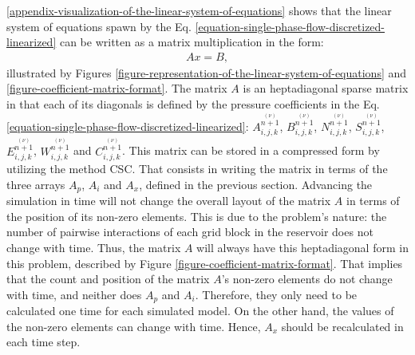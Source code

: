 \autoref{appendix-visualization-of-the-linear-system-of-equations} shows that the linear system of equations spawn by the Eq. \ref{equation-single-phase-flow-discretized-linearized} can be written as a matrix multiplication in the form:
%
\begin{align}
	A x = B,
\end{align}
%
illustrated by Figures \ref{figure-representation-of-the-linear-system-of-equations} and \ref{figure-coefficient-matrix-format}. 
%
The matrix $A$ is an heptadiagonal sparse matrix in that each of its diagonals is defined by the pressure coefficients in the Eq. \ref{equation-single-phase-flow-discretized-linearized}: $A^{\stackrel{(\nu)}{n+1}}_{i,j,k}$, $B^{\stackrel{(\nu)}{n+1}}_{i,j,k}$, $N^{\stackrel{(\nu)}{n+1}}_{i,j,k}$, $S^{\stackrel{(\nu)}{n+1}}_{i,j,k}$, $E^{\stackrel{(\nu)}{n+1}}_{i,j,k}$, $W^{\stackrel{(\nu)}{n+1}}_{i,j,k}$ and $C^{\stackrel{(\nu)}{n+1}}_{i,j,k}$.
%
This matrix can be stored in a compressed form by utilizing the method CSC. 
%
That consists in writing the matrix in terms of the three arrays $A_p$, $A_i$ and $A_x$, defined in the previous section. 
%
Advancing the simulation in time will not change the overall layout of the matrix $A$ in terms of the position of its non-zero elements. 
%
This is due to the problem's nature: the number of pairwise interactions of each grid block in the reservoir does not change with time. 
%
Thus, the matrix $A$ will always have this heptadiagonal form in this problem, described by Figure \ref{figure-coefficient-matrix-format}. 
%
That implies that the count and position of the matrix $A$'s non-zero elements do not change with time, and neither does $A_p$ and $A_i$. 
%
Therefore, they only need to be calculated one time for each simulated model. 
%
On the other hand, the values of the non-zero elements can change with time. 
%
Hence, $A_x$ should be recalculated in each time step. 

